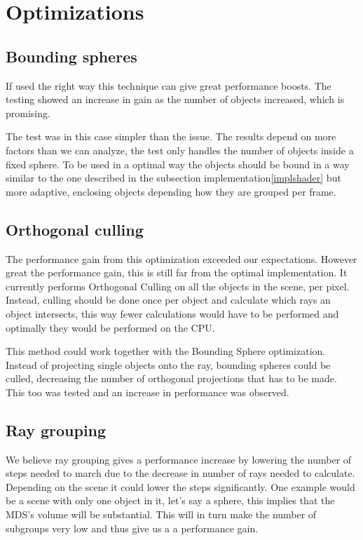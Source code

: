 	\section{Optimizations} \label{optimization}

		\subsection{Bounding spheres}

			If used the right way this technique can give great performance 
			boosts. The testing showed an increase in gain as the number of 
			objects increased, which is promising.

			The test was in this case simpler than the issue. The results depend
			on more factors than we can analyze, the test only handles the 
			number of objects inside a fixed sphere. To be used in a optimal way
			the objects should be bound in a way similar to the one described in
			the subsection implementation\ref{implshader} but more adaptive, 
			enclosing objects depending how they are grouped per frame. 

		\subsection{Orthogonal culling}

			The performance gain from this optimization exceeded our 
			expectations. However great the performance gain, this
			is still far from the optimal implementation. It currently performs 
			Orthogonal Culling on all the objects in the scene, per pixel. 
			Instead, culling should be done once per object and calculate 
			which rays an object intersects, this way fewer calculations would
			have to be performed and optimally they would be performed on the
			CPU.

			This method could work together with the Bounding Sphere
			optimization. Instead of projecting single objects onto the ray,
			bounding spheres could be culled, decreasing the number of
			orthogonal projections that has to be made. This too was tested and
			an increase in performance was observed.
			
		\subsection{Ray grouping}
		
			
			We believe ray grouping gives a performance increase by lowering
			the number of steps needed to march due to the decrease in number 
			of rays needed to calculate. Depending on the scene it could lower 
			the steps significantly. One example would be a scene with only one 
			object in it, let's say a sphere, this implies that the MDS's volume 
			will be substantial. This will in turn make the number of subgroups 
			very low and thus give us a a performance gain. 
			
